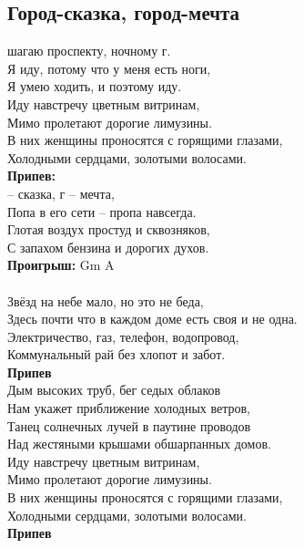 \documentclass[fleqn,a5paper,12pt,twoside]{guitartabs}
\newcommand{\musSharp}{\texttt{\#}}
\newcommand{\musVspace}{\vspace{2mm}}
\begin{document}
\subsection*{Город-сказка, город-мечта}
     шагаю \CHORD{A\musSharp}{по} проспекту,  ночному г.\\
    Я иду, потому что у меня есть ноги,\\
    Я умею ходить, и поэтому иду.\\
    Иду навстречу цветным витринам,\\
    Мимо пролетают дорогие лимузины.\\
    В них женщины проносятся с горящими глазами,\\
    Холодными сердцами, золотыми волосами.\\

    \-\hspace{10mm}\textbf{Припев:}\\
    \-\hspace{10mm} -- сказка, г -- мечта,\\
    \-\hspace{10mm}Попа в его сети -- пропа\CHORD{A\musSharp}{даешь} навсегда.\\
    \-\hspace{10mm}Глотая воздух простуд и сквозняков,\\
    \-\hspace{10mm}С запахом бензина и дорогих духов.\\
    \-\hspace{10mm}\textbf{Проигрыш:} Gm A\\
    \\
    Звёзд на небе мало, но это не беда,\\
    Здесь почти что в каждом доме есть своя и не одна.\\
    Электричество, газ, телефон, водопровод,\\
    Коммунальный рай без хлопот и забот.\musVspace\\
    \-\hspace{10mm}\textbf{Припев}\musVspace\\
    Дым высоких труб, бег седых облаков\\
    Нам укажет приближение холодных ветров,\\
    Танец солнечных лучей в паутине проводов\\
    Над жестяными крышами обшарпанных домов.\\
    Иду навстречу цветным витринам,\\
    Мимо пролетают дорогие лимузины.\\
    В них женщины проносятся с горящими глазами,\\
    Холодными сердцами, золотыми волосами.\musVspace\\
    \-\hspace{10mm}\textbf{Припев} \\
\newpage
{}%
\end{document}
